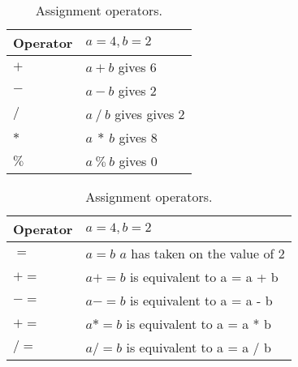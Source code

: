 \begin{table}[h]
\begin{center}
    \parbox{.45\linewidth}{
        \begin{tabular}{| l | l |}
        \hline
        Operator & $a=4, b=2$ \\ \hline
        $+$ &  $a + b$ gives 6 \\  \hline
        $-$ &  $a - b$ gives 2  \\ \hline
        $/$ &  $a~/~b$ gives gives 2 \\ \hline
        $*$ &  $a~*~b$ gives 8  \\ \hline
        $\%$ & $a~\%~b$ gives 0 \\ \hline
        \end{tabular}
        \caption{Arithmetic operators.}
    }
    \parbox{.45\linewidth}{
        \begin{tabular}{| l | l |}
        \hline
        Operator & $a=4, b=2$ \\ \hline
        $=$  &  $a = b$  $a$ has taken on the value of 2 \\ \hline
        $+=$ &  $a += b$ is equivalent to a = a + b\\ \hline
        $-=$ &  $a -= b$ is equivalent to a = a - b \\ \hline
        $+=$ &  $a *= b$ is equivalent to a = a * b\\ \hline
        $/=$ &  $a /= b$ is equivalent to a = a / b\\ \hline
        \end{tabular}
        \caption{Assignment operators.}
    }
\end{center}
\end{table}

